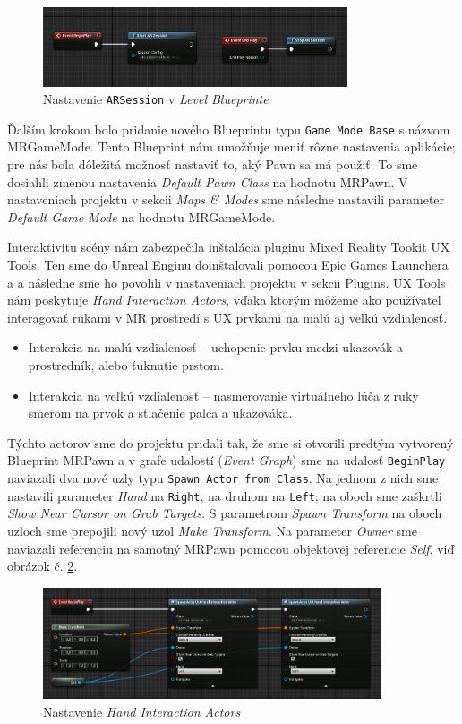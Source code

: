 \begin{figure}[!htbp]
  \centering
  \includegraphics[width=9cm]{img/arsession.png}
  \caption{Nastavenie \texttt{ARSession} v \emph{Level Blueprinte}}
  \label{arsession}
\end{figure}

Ďalším krokom bolo pridanie nového Blueprintu typu \texttt{Game Mode Base} s názvom MRGameMode. Tento Blueprint nám umožňuje meniť rôzne nastavenia aplikácie; pre nás bola dôležitá možnosť nastaviť 
to, aký Pawn sa má použiť. To sme dosiahli zmenou nastavenia \emph{Default Pawn Class} na hodnotu MRPawn. V nastaveniach projektu v sekcii \emph{Maps \& Modes} sme následne nastavili parameter
\emph{Default Game Mode} na hodnotu MRGameMode.

Interaktivitu scény nám zabezpečila inštalácia pluginu Mixed Reality Tookit UX Tools. Ten sme do Unreal Enginu doinštalovali pomocou Epic Games Launchera a a následne sme ho povolili v nastaveniach
projektu v sekcii Plugins. UX Tools nám poskytuje \emph{Hand Interaction Actors}, vďaka ktorým môžeme ako používateľ interagovať rukami v MR prostredí s UX prvkami na malú aj veľkú vzdialenosť.
\begin{itemize}
  \item Interakcia na malú vzdialenosť {--} uchopenie prvku medzi ukazovák a prostredník, alebo ťuknutie prstom.
  \item Interakcia na veľkú vzdialenosť {--} nasmerovanie virtuálneho lúča z ruky smerom na prvok a stlačenie palca a ukazováka.
\end{itemize}
Týchto actorov sme do projektu pridali tak, že sme si otvorili predtým vytvorený Blueprint MRPawn a v grafe udalostí (\emph{Event Graph}) sme na udalosť \texttt{BeginPlay} naviazali dva nové uzly
typu \texttt{Spawn Actor from Class}. Na jednom z nich sme nastavili parameter \emph{Hand} na \texttt{Right}, na druhom na \texttt{Left}; na oboch sme zaškrtli \emph{Show Near Cursor on Grab Targets}.
S parametrom \emph{Spawn Transform} na oboch uzloch sme prepojili nový uzol \emph{Make Transform}. Na parameter \emph{Owner} sme naviazali referenciu na samotný MRPawn pomocou objektovej referencie
\emph{Self}, viď obrázok č. \ref{spawn-actor}.

\begin{figure}[!htbp]
  \centering
  \includegraphics[width=10cm]{img/spawn-actor.png}
  \caption{Nastavenie \emph{Hand Interaction Actors}}
  \label{spawn-actor}
\end{figure}

